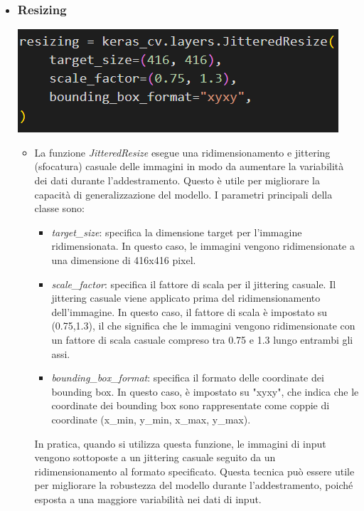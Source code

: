 \documentclass{report}
\begin{document}
\begin{itemize}
\item
\subsubsection{Resizing}
\includegraphics[height=%
0.1\textheight]{resize}\\
\begin{itemize}
\item La funzione {\itshape JitteredResize} esegue una ridimensionamento e jittering (sfocatura) casuale delle immagini in modo da aumentare la variabilità dei dati durante l'addestramento. Questo è utile per migliorare la capacità di generalizzazione del modello.
I parametri principali della classe sono:
\begin{itemize}
\item {\itshape target\_size}: specifica la dimensione target per l'immagine ridimensionata. In questo caso, le immagini vengono ridimensionate a una dimensione di 416x416 pixel.

\item {\itshape scale\_factor}: specifica il fattore di scala per il jittering casuale. Il jittering casuale viene applicato prima del ridimensionamento dell'immagine. In questo caso, il fattore di scala è impostato su (0.75,1.3), il che significa che le immagini vengono ridimensionate con un fattore di scala casuale compreso tra 0.75 e 1.3 lungo entrambi gli assi.

\item {\itshape bounding\_box\_format}: specifica il formato delle coordinate dei bounding box. In questo caso, è impostato su "xyxy", che indica che le coordinate dei bounding box sono rappresentate come coppie di coordinate (x\_min, y\_min, x\_max, y\_max).
\end{itemize}
In pratica, quando si utilizza questa funzione, le immagini di input vengono sottoposte a un jittering casuale seguito da un ridimensionamento al formato specificato. Questa tecnica può essere utile per migliorare la robustezza del modello durante l'addestramento, poiché esposta a una maggiore variabilità nei dati di input.

\end{itemize}
\end{itemize}
\end{document}
